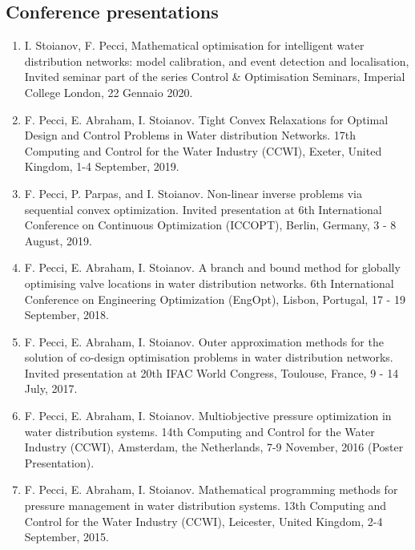 \documentclass[11pt,a4paper,roman]{moderncv}        %
\begin{document}
\subsection*{\textbf{Conference presentations}}
\small
\begin{enumerate}
\item I. Stoianov, F. Pecci, Mathematical optimisation for intelligent water distribution networks: model calibration, and event detection and localisation, Invited seminar part of the series Control \& Optimisation Seminars, Imperial College London, 22 Gennaio 2020.
\item {F. Pecci}, E. Abraham, I. Stoianov. Tight Convex Relaxations for Optimal Design and Control Problems in Water distribution Networks. 17th Computing and Control for the Water Industry (CCWI), Exeter, United Kingdom, 1-4 September, 2019.
\item F. Pecci, P. Parpas, and I. Stoianov. Non-linear inverse problems via sequential convex optimization. Invited presentation at 6th International Conference on Continuous Optimization (ICCOPT), Berlin, Germany, 3 - 8 August, 2019.
\item {F. Pecci}, E. Abraham, I. Stoianov. A branch and bound method for globally optimising valve locations in water distribution networks. 6th International Conference on Engineering Optimization (EngOpt), Lisbon, Portugal, 17 - 19 September, 2018.
\item {F. Pecci}, E. Abraham, I. Stoianov. Outer approximation methods for the solution of co-design optimisation problems in water distribution networks. Invited presentation at 20th IFAC World Congress, Toulouse, France, 9 - 14 July, 2017.
\item {F. Pecci}, E. Abraham, I. Stoianov. Multiobjective pressure optimization in water distribution systems. 14th Computing and Control for the Water Industry (CCWI), Amsterdam, the Netherlands, 7-9 November, 2016 (Poster Presentation).
\item {F. Pecci}, E. Abraham, I. Stoianov. Mathematical programming methods for pressure management in water distribution systems. 13th Computing and Control for the Water Industry (CCWI), Leicester, United Kingdom, 2-4 September, 2015.
\end{enumerate}
\nocite{*}
\end{document}

